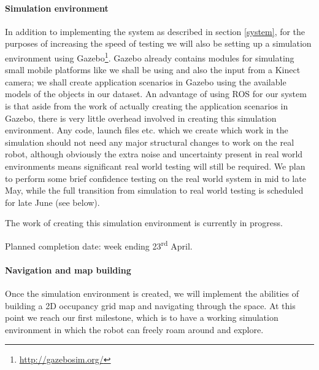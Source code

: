 \documentclass[a4paper,11pt,english]{article}
\begin{document}
\paragraph{Simulation environment}
In addition to implementing the system as described in section \ref{system}, for the purposes of increasing the speed of testing we will also be setting up a simulation environment using Gazebo\footnote{\url{http://gazebosim.org/}}.
Gazebo already contains modules for simulating small mobile platforms like we shall be using and also the input from a Kinect camera; we shall create application scenarios in Gazebo using the available models of the objects in our dataset.
An advantage of using ROS for our system is that aside from the work of actually creating the application scenarios in Gazebo, there is very little overhead involved in creating this simulation environment.
Any code, launch files etc. which we create which work in the simulation should not need any major structural changes to work on the real robot, although obviously the extra noise and uncertainty present in real world environments means significant real world testing will still be required.
We plan to perform some brief confidence testing on the real world system in mid to late May, while the full transition from simulation to real world testing is scheduled for late June (see below).

The work of creating this simulation environment is currently in progress.

Planned completion date: week ending 23\textsuperscript{rd} April.


\paragraph{Navigation and map building}
Once the simulation environment is created, we will implement the abilities of building a 2D occupancy grid map and navigating through the space.
At this point we reach our first milestone, which is to have a working simulation environment in which the robot can freely roam around and explore.
\end{document}
